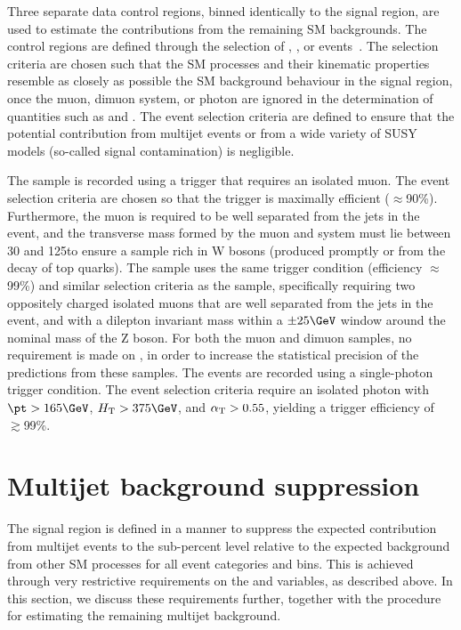 Three separate data control regions, binned identically to the signal
region, are used to estimate the contributions from the remaining SM
backgrounds. The control regions are defined through the selection of
\mj, \mmj, or \gj events~\cite{RA1Paper2012}. The selection criteria
are chosen such that the SM processes and their kinematic properties
resemble as closely as possible the SM background behaviour in the
signal region, once the muon, dimuon system, or photon are ignored in
the determination of quantities such as \scalht and \alphat. The event
selection criteria are defined to ensure that the potential
contribution from multijet events or from a wide variety of SUSY
models (\ie so-called signal contamination) is negligible.

The \mj sample is recorded using a trigger that requires an isolated
muon. The event selection criteria are chosen so that the trigger is
maximally efficient ($\approx$90\%). Furthermore, the muon is required
to be well separated from the jets in the event, and the transverse
mass formed by the muon and \ETmiss system must lie between 30 and
125\GeV to ensure a sample rich in W bosons (produced promptly or from
the decay of top quarks). The \mmj sample uses the same trigger
condition (efficiency $\approx$99\%) and similar selection criteria as
the \mj sample, specifically requiring two oppositely charged isolated
muons that are well separated from the jets in the event, and with a
dilepton invariant mass within a $\pm 25\GeV$ window around the
nominal mass of the Z boson. For both the muon and dimuon samples, no
requirement is made on \alphat, in order to increase the statistical
precision of the predictions from these samples.  The \gj events are
recorded using a single-photon trigger condition. The event selection
criteria require an isolated photon with $\pt > 165\GeV$, $\scalht >
375\GeV$, and $\alpha_\mathrm{T} > 0.55$, yielding a trigger efficiency
of~$\gtrsim$99\%.


\section{Multijet background suppression \label{sec:multijet}}

The signal region is defined in a manner to suppress the expected
contribution from multijet events to the sub-percent level relative to
the expected background from other SM processes for all event
categories and \scalht bins. This is achieved through very restrictive
requirements on the \alphat and \dphi variables, as described
above. In this section, we discuss these requirements further,
together with the procedure for estimating the remaining multijet
background.

